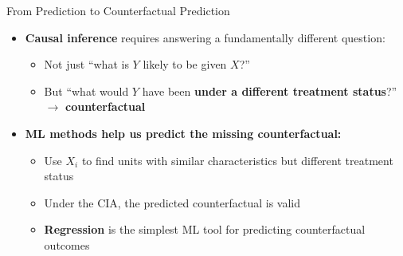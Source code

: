 \documentclass[dvipsnames,hyperref={pdfpagelabels=false}]{beamer}
\begin{document}
\begin{frame}{From Prediction to Counterfactual Prediction}
	\begin{itemize}
		\item \textbf{Causal inference} requires answering a fundamentally different question:
		\vspace{0.2cm}
		\begin{itemize}
			\item Not just ``what is $Y$ likely to be given $X$?''
			\vspace{0.2cm}
			\item But ``what would $Y$ have been \textbf{under a different treatment status}?'' $\longrightarrow$ \textbf{counterfactual}
		\end{itemize}
		\vspace{0.2cm}
		\item \textbf{ML methods help us predict the missing counterfactual:}
		\vspace{0.2cm}
		\begin{itemize}
			\item Use $X_i$ to find units with similar characteristics but different treatment status
			\vspace{0.2cm}
			\item Under the CIA, the predicted counterfactual is valid
			\vspace{0.2cm}
			\item \textbf{Regression} is the simplest ML tool for predicting counterfactual outcomes
		\end{itemize}
	\end{itemize}
\end{frame}
\end{document}
